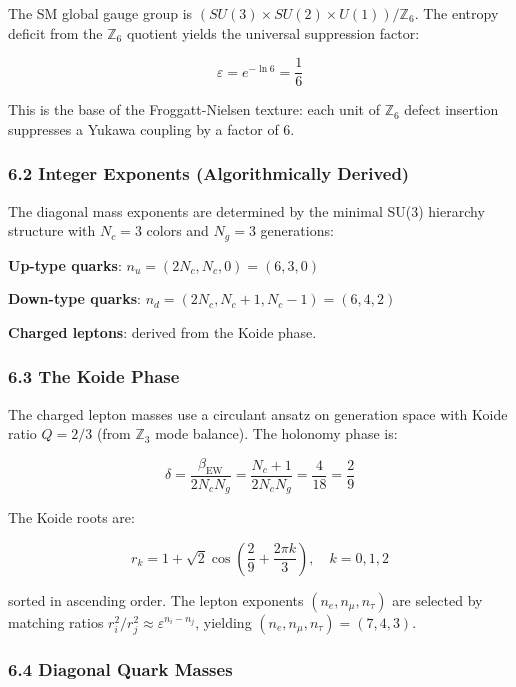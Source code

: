 The SM global gauge group is \((SU(3) \times SU(2) \times U(1))/\mathbb{Z}_6\). The entropy deficit from the \(\mathbb{Z}_6\) quotient yields the universal suppression factor:

\[\varepsilon = e^{-\ln 6} = \frac{1}{6}\]

This is the base of the Froggatt-Nielsen texture: each unit of \(\mathbb{Z}_6\) defect insertion suppresses a Yukawa coupling by a factor of 6.

\subsubsection{6.2 Integer Exponents (Algorithmically Derived)}\label{62-integer-exponents-algorithmically-derived}

The diagonal mass exponents are determined by the minimal SU(3) hierarchy structure with \(N_c = 3\) colors and \(N_g = 3\) generations:

\textbf{Up-type quarks}: \(n_u = (2N_c, N_c, 0) = (6, 3, 0)\)

\textbf{Down-type quarks}: \(n_d = (2N_c, N_c+1, N_c-1) = (6, 4, 2)\)

\textbf{Charged leptons}: derived from the Koide phase.

\subsubsection{6.3 The Koide Phase}\label{63-the-koide-phase}

The charged lepton masses use a circulant ansatz on generation space with Koide ratio \(Q = 2/3\) (from \(\mathbb{Z}_3\) mode balance). The holonomy phase is:

\[\delta = \frac{\beta_{\text{EW}}}{2 N_c N_g} = \frac{N_c + 1}{2 N_c N_g} = \frac{4}{18} = \frac{2}{9}\]

The Koide roots are:

\[r_k = 1 + \sqrt{2}\cos\left(\frac{2}{9} + \frac{2\pi k}{3}\right), \quad k = 0, 1, 2\]

sorted in ascending order. The lepton exponents \((n_e, n_\mu, n_\tau)\) are selected by matching ratios \(r_i^2/r_j^2 \approx \varepsilon^{n_i - n_j}\), yielding \((n_e, n_\mu, n_\tau) = (7, 4, 3)\).

\subsubsection{6.4 Diagonal Quark Masses}\label{64-diagonal-quark-masses}

